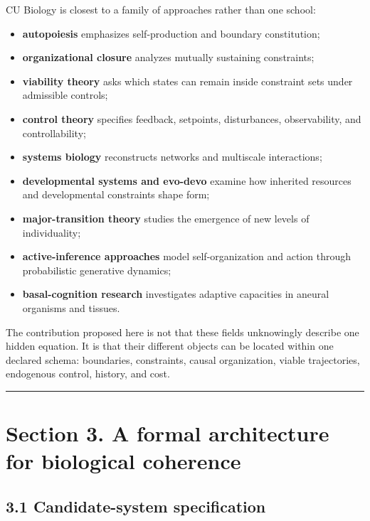 \documentclass[
  11pt,
]{article}
\providecommand{\tightlist}{%
  \setlength{\itemsep}{0pt}\setlength{\parskip}{0pt}}
\begin{document}
CU Biology is closest to a family of approaches rather than one school:

\begin{itemize}
\tightlist
\item
  \textbf{autopoiesis} emphasizes self-production and boundary
  constitution;
\item
  \textbf{organizational closure} analyzes mutually sustaining
  constraints;
\item
  \textbf{viability theory} asks which states can remain inside
  constraint sets under admissible controls;
\item
  \textbf{control theory} specifies feedback, setpoints, disturbances,
  observability, and controllability;
\item
  \textbf{systems biology} reconstructs networks and multiscale
  interactions;
\item
  \textbf{developmental systems and evo-devo} examine how inherited
  resources and developmental constraints shape form;
\item
  \textbf{major-transition theory} studies the emergence of new levels
  of individuality;
\item
  \textbf{active-inference approaches} model self-organization and
  action through probabilistic generative dynamics;
\item
  \textbf{basal-cognition research} investigates adaptive capacities in
  aneural organisms and tissues.
\end{itemize}

The contribution proposed here is not that these fields unknowingly
describe one hidden equation. It is that their different objects can be
located within one declared schema: boundaries, constraints, causal
organization, viable trajectories, endogenous control, history, and
cost.

\begin{center}\rule{0.5\linewidth}{0.5pt}\end{center}

\section{Section 3. A formal architecture for biological
coherence}\label{section-3.-a-formal-architecture-for-biological-coherence}

\subsection{3.1 Candidate-system
specification}\label{candidate-system-specification}
\end{document}
